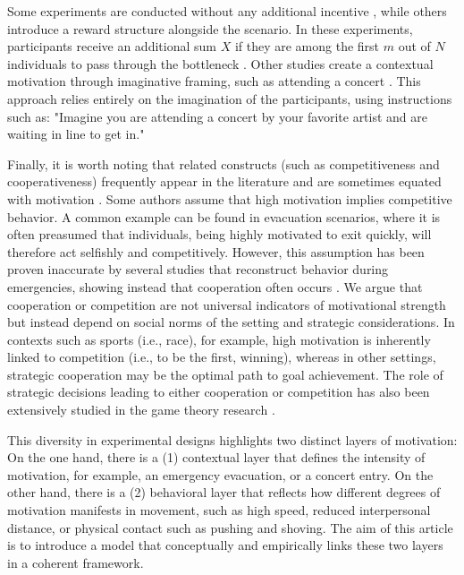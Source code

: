 \documentclass[pdflatex,sn-mathphys-num]{sn-jnl}%
\theoremstyle{thmstyleone}%
\theoremstyle{thmstyletwo}%
\theoremstyle{thmstylethree}%
\begin{document}
Some experiments are conducted without any additional incentive \cite{li_bottleneck_2020, li_bottleneck_2021}, while others introduce a reward structure alongside the scenario. In these experiments, participants receive an additional sum $X$ if they are among the first $m$ out of $N$ individuals to pass through the bottleneck \cite{mintz_nonadaptive_1951, muir_effects_1996, li_motivation_2024}. Other studies create a contextual motivation through imaginative framing, such as attending a concert \cite{sieben_collective_2017, adrian_crowds_2020, sieben_repertoires_2025}. This approach relies entirely on the imagination of the participants, using instructions such as: "Imagine you are attending a concert by your favorite artist and are waiting in line to get in."

Finally, it is worth noting that related constructs (such as competitiveness and cooperativeness) frequently appear in the literature and are sometimes equated with motivation \cite{mintz_nonadaptive_1951, sime_escape_1983}. Some authors assume that high motivation implies competitive behavior. A common example can be found in evacuation scenarios, where it is often preasumed that individuals, being highly motivated to exit quickly, will therefore act selfishly and competitively. However, this assumption has been proven inaccurate by several studies that reconstruct behavior during emergencies, showing instead that cooperation often occurs \cite{drury_collective_2009, levine_identity_2005}. We argue that  cooperation or competition are not universal indicators of motivational strength but instead depend on social norms of the setting and strategic considerations. In contexts such as sports (i.e., race), for example, high motivation is inherently linked to competition (i.e., to be the first, winning), whereas in other settings, strategic cooperation may be the optimal path to goal achievement. The role of strategic decisions leading to either cooperation or competition has also been extensively studied in the game theory research \cite{axelrod_evolution_1981}. 

This diversity in experimental designs highlights two distinct layers of motivation: On the one hand, there is a (1) contextual layer that defines the intensity of motivation, for example, an emergency evacuation, or a concert entry. On the other hand, there is a (2) behavioral layer that reflects how different degrees of motivation manifests in movement, such as high speed, reduced interpersonal distance, or physical contact such as pushing and shoving. The aim of this article is to introduce a model that conceptually and empirically links these two layers in a coherent framework.
\end{document}
